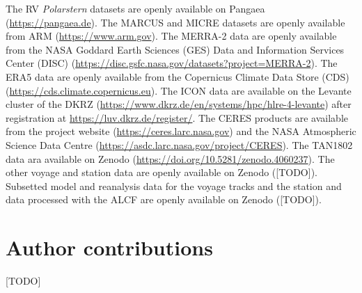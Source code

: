 \documentclass[12pt,a4paper]{article}
\begin{document}
The RV \emph{Polarstern} datasets are openly available on Pangaea
(\url{https://pangaea.de}). The MARCUS and MICRE datasets are openly available
from ARM (\url{https://www.arm.gov}). The MERRA-2 data are openly available
from the NASA Goddard Earth Sciences (GES) Data and Information Services Center
(DISC) (\url{https://disc.gsfc.nasa.gov/datasets?project=MERRA-2}).  The ERA5
data are openly available from the Copernicus Climate Data Store (CDS)
(\url{https://cds.climate.copernicus.eu}). The ICON data are available on the
Levante cluster of the DKRZ
(\url{https://www.dkrz.de/en/systems/hpc/hlre-4-levante}) after registration at
\url{https://luv.dkrz.de/register/}. The CERES products are available from the
project website (\url{https://ceres.larc.nasa.gov}) and the NASA Atmospheric
Science Data Centre (\url{https://asdc.larc.nasa.gov/project/CERES}).  The
TAN1802 data ara available on Zenodo
(\url{https://doi.org/10.5281/zenodo.4060237}).  The other voyage and station
data are openly available on Zenodo ([TODO]). Subsetted model and reanalysis data
for the voyage tracks and the station and data processed with the ALCF are
openly available on Zenodo ([TODO]).

\section*{Author contributions}

[TODO]

\fontsize{11pt}{13pt}\selectfont
\setlength{\bibsep}{0.0pt}

\end{document}
